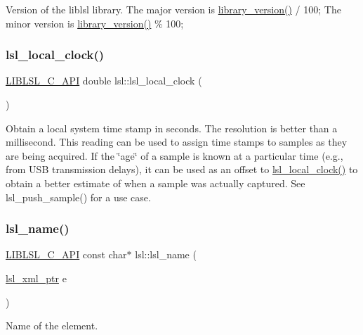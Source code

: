 Version of the liblsl library. The major version is \hyperlink{namespacelsl_a25fc4deea3c2fb0df0744e3a24c56844}{library\+\_\+version()} / 100; The minor version is \hyperlink{namespacelsl_a25fc4deea3c2fb0df0744e3a24c56844}{library\+\_\+version()} \% 100; \mbox{\label{namespacelsl_a475274f88a060924c9bd1b38879ec63a}} 
\subsubsection{\texorpdfstring{lsl\+\_\+local\+\_\+clock()}{lsl\_local\_clock()}}
{\footnotesize\ttfamily \hyperlink{lsl__cpp_8h_aafd0ef1813e8be84a1420c4f1df64615}{L\+I\+B\+L\+S\+L\+\_\+\+C\+\_\+\+A\+PI} double lsl\+::lsl\+\_\+local\+\_\+clock (\begin{DoxyParamCaption}{ }\end{DoxyParamCaption})}

Obtain a local system time stamp in seconds. The resolution is better than a millisecond. This reading can be used to assign time stamps to samples as they are being acquired. If the \char`\"{}age\char`\"{} of a sample is known at a particular time (e.\+g., from U\+SB transmission delays), it can be used as an offset to \hyperlink{namespacelsl_a475274f88a060924c9bd1b38879ec63a}{lsl\+\_\+local\+\_\+clock()} to obtain a better estimate of when a sample was actually captured. See lsl\+\_\+push\+\_\+sample() for a use case. \mbox{\label{namespacelsl_a55761eae47f0963850f6077b4c61701e}} 
\subsubsection{\texorpdfstring{lsl\+\_\+name()}{lsl\_name()}}
{\footnotesize\ttfamily \hyperlink{lsl__cpp_8h_aafd0ef1813e8be84a1420c4f1df64615}{L\+I\+B\+L\+S\+L\+\_\+\+C\+\_\+\+A\+PI} const char$\ast$ lsl\+::lsl\+\_\+name (\begin{DoxyParamCaption}\item[{\hyperlink{namespacelsl_a5edc7a49a1a1be1634fe6dce3d59c59b}{lsl\+\_\+xml\+\_\+ptr}}]{e }\end{DoxyParamCaption})}

Name of the element. \mbox{\label{namespacelsl_ad719cddda958c613ff328245dc5b4277}} 
